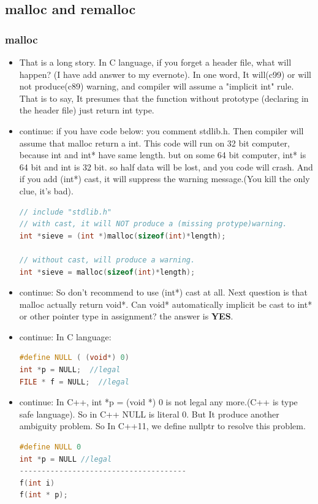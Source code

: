 \documentclass[a4paper,12pt,twoside]{book}
\begin{document}
\subsection{malloc and remalloc}
\subsubsection{malloc}
\begin{itemize}
\item That is a long story. In C language, if you forget a header file, what will happen? (I have add answer to my evernote). In one word, It will(c99) or will not produce(c89) warning, and compiler will assume a "implicit int" rule. That is to say, It presumes that the function without prototype (declaring in the header file) just return int type.

\item continue: if you have code below: you comment stdlib.h. Then compiler will assume that malloc return a int.  This code will run on 32 bit computer, because int and int* have same length. but on some 64 bit computer, int* is 64 bit and int is 32 bit.  so half data will be lost, and you code will crash.
And if you add (int*) cast, it will suppress the warning message.(You kill the only clue, it's bad).
 \begin{lstlisting}[frame=single, language=c++]
 // include "stdlib.h"
// with cast, it will NOT produce a (missing protype)warning.
int *sieve = (int *)malloc(sizeof(int)*length);

// without cast, will produce a warning.
int *sieve = malloc(sizeof(int)*length);
\end{lstlisting}

\item continue: So don't recommend to use (int*) cast at all. Next question is that malloc actually return void*. Can void* automatically implicit be cast to int* or other pointer type in assignment? the answer is \textbf{YES}.

\item  continue: In C language:
 \begin{lstlisting}[frame=single, language=c++]
#define NULL ( (void*) 0)
int *p = NULL;  //legal
FILE * f = NULL;  //legal
\end{lstlisting}

\item continue: In C++, int *p = (void *) 0 is not legal any more.(C++ is type safe language).  So in C++ NULL is literal 0. But It produce another ambiguity problem.  So In C++11, we define nullptr to resolve this problem.
 \begin{lstlisting}[frame=single, language=c++]
#define NULL 0
int *p = NULL //legal
--------------------------------------
f(int i)
f(int * p);


\end{lstlisting}
\end{itemize}
\end{document}

